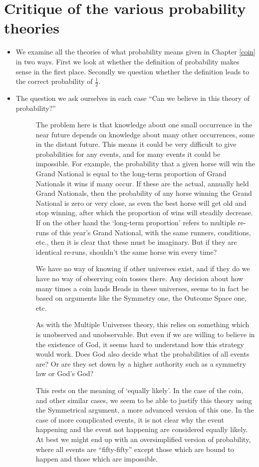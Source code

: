 \chapter{Critique of the various probability theories}
\label{probcrit}
\begin{itemize}
\item
We examine all the theories of what probability means given in Chapter \ref{coin} in two ways. First we look at whether the definition of probability makes sense in the first place. Secondly we question whether the definition leads to the correct probability of $\frac{1}{2}$.
\item
The question we ask ourselves in each case ``Can we believe in this theory of probability?''
\begin{description}
\item[]
The problem here is that knowledge about one small occurrence in the near future depends on knowledge about many other occurrences, some in the distant future. This means it could be very difficult to give probabilities for any events, and for many events it could be impossible. For example, the probability that a given horse will win the Grand National is equal to the long-term proportion of Grand Nationals it wins if many occur. If these are the actual, annually held Grand Nationals, then the probability of any horse winning the Grand National is zero or very close, as even the best horse will get old and stop winning, after which the proportion of wins will steadily decrease. If on the other hand the `long-term proportion' refers to multiple re-runs of this year's Grand National, with the same runners, conditions, etc., then it is clear that these must be imaginary. But if they are identical re-runs, shouldn't the same horse win every time? 
\item[]
We have no way of knowing if other universes exist, and if they do we have no way of observing coin tosses there. Any decision about how many times a coin lands Heads in these universes, seems to in fact be based on arguments like the Symmetry one, the Outcome Space one, etc.
\item[]
As with the Multiple Universes theory, this relies on something which is unobserved and unobservable. But even if we are willing to believe in the existence of God, it seems hard to understand how this strategy would work. Does God also decide what the probabilities of all events are? Or are they set down by a higher authority such as a symmetry law or God's God? 
\item[]
This rests on the meaning of `equally likely'. In the case of the coin, and other similar cases, we seem to be able to justify this theory using the Symmetrical argument, a more advanced version of this one. In the case of more complicated events, it is not clear why the event happening and the event not happening are considered equally likely. At best we might end up with an oversimplified version of probability, where all events are ``fifty-fifty'' except those which are bound to happen and those which are impossible.
\item[]


\end{description}
\end{itemize}

